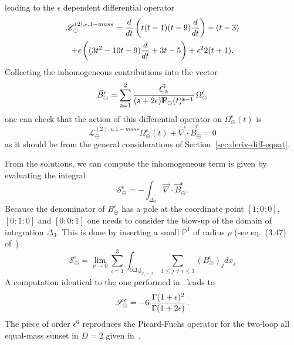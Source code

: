 \documentclass[a4paper,12pt]{article}
\newcommand\lNote[1]{
	\todo[backgroundcolor=red!20!white,fancyline,
	bordercolor=white]{ LDLC:  #1}}
\numberwithin{equation}{section}
\numberwithin{figure}{section}
\def\su{\circleddash}
\begin{document}
leading to the $\epsilon$ dependent \lNote{nomenclature} differential operator
\begin{multline}
  \label{e:PF2sunset1massepsilon}
     \mathscr{L}^{(2),\epsilon,1-mass}_\su ={d\over dt}\left( t(t-1)(t-9)
       {d\over dt}\right)+(t-3)\cr+\epsilon\left((3t^2-10t-9) {d\over
         dt}+3t-5\right)
     +\epsilon^2 2(t+1).
\end{multline}
%
Collecting the inhomogeneous contributions into the vector
\begin{equation}
  \vec B_\su^\epsilon=\sum_{\mathsf{a}=1}^2 {\vec C_{\mathsf{a}}\over
    (\mathsf{a}+2\epsilon)\textbf{F}_\su(t)^{\mathsf{a}-1}}\, \Omega_\su^\epsilon
\end{equation}
one can check that the action of this differential operator on
$\Omega_{\su}^\epsilon(t)$ is
\begin{equation}
      \mathscr{L}^{(2),\epsilon,1-mass}_\su
      \Omega_{\su}^\epsilon(t)+\vec\nabla \cdot\vec B_\su^\epsilon=0
    \end{equation}
as it should be from the general considerations of Section~\ref{sec:deriv-diff-equat}.


\medskip
From the solutions, we can compute the  inhomogeneous term is given by evaluating the integral 
\begin{equation}
  \mathscr{S}_\su^\epsilon
  =-\int_{\Delta_3} \vec\nabla\cdot\vec B^\epsilon_\su.
\end{equation}
%
Because the denominator of $ B^\epsilon_\su$ has a pole at the coordinate
point $[1:0:0]$, $[0:1:0]$ and $[0:0:1]$ one needs to consider the
blow-up  of the domain of integration $\Delta_3$. This is done by inserting a small
$\mathbb P^1$ of radius $\rho$ (see eq.~(3.47) of~\cite{Bloch:2016izu})
\begin{equation}
    \mathscr{S}_\su^\epsilon=\lim_{\rho\to0} \sum_{i=1}^3
    \int_{\partial\tilde\Delta_3|_{x_i=0}} \sum_{1\leq j\neq i\leq 3}
    (B^\epsilon_\su)_j dx_j
\end{equation}
A computation identical to the one performed in~\cite{Bloch:2016izu} leads to
\begin{equation}
 \mathscr{S}_\su^\epsilon=  -6 \, {\Gamma(1+\epsilon)^2\over \Gamma(1+2\epsilon)} \, . 
\end{equation}
The piece of order $\epsilon^0$ reproduces the Picard-Fuchs operator
for the two-loop all equal-mass sunset in $D=2$ given
in~\cite{Bloch:2013tra,Bloch:2013tra,Vanhove:2014wqa,Bonisch:2020qmm,Pogel:2022vat}.

\end{document}

